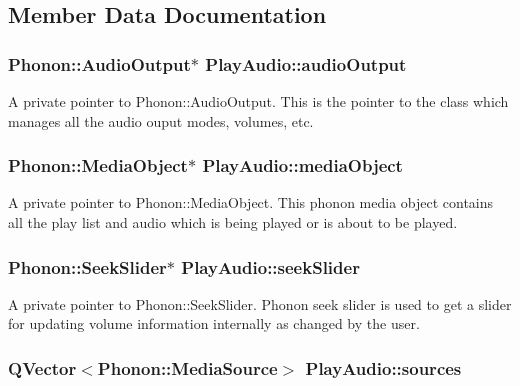 \subsection{Member Data Documentation}
\hypertarget{classPlayAudio_a91e318098e325117af6e94c9aaf826ef}{
\subsubsection[{audioOutput}]{\setlength{\rightskip}{0pt plus 5cm}Phonon::AudioOutput$\ast$ {\bf PlayAudio::audioOutput}}}
\label{classPlayAudio_a91e318098e325117af6e94c9aaf826ef}
A private pointer to Phonon::AudioOutput. This is the pointer to the class which manages all the audio ouput modes, volumes, etc. \hypertarget{classPlayAudio_a58c02857fd039d8015c0fae749682e91}{
\subsubsection[{mediaObject}]{\setlength{\rightskip}{0pt plus 5cm}Phonon::MediaObject$\ast$ {\bf PlayAudio::mediaObject}}}
\label{classPlayAudio_a58c02857fd039d8015c0fae749682e91}
A private pointer to Phonon::MediaObject. This phonon media object contains all the play list and audio which is being played or is about to be played. \hypertarget{classPlayAudio_ae1feb0a9b9fcf14d2aedf599dbbe9335}{
\subsubsection[{seekSlider}]{\setlength{\rightskip}{0pt plus 5cm}Phonon::SeekSlider$\ast$ {\bf PlayAudio::seekSlider}}}
\label{classPlayAudio_ae1feb0a9b9fcf14d2aedf599dbbe9335}
A private pointer to Phonon::SeekSlider. Phonon seek slider is used to get a slider for updating volume information internally as changed by the user. \hypertarget{classPlayAudio_aa80d497cf68f1acd768f5abdb564a60a}{
\subsubsection[{sources}]{\setlength{\rightskip}{0pt plus 5cm}QVector$<$Phonon::MediaSource$>$ {\bf PlayAudio::sources}}}
